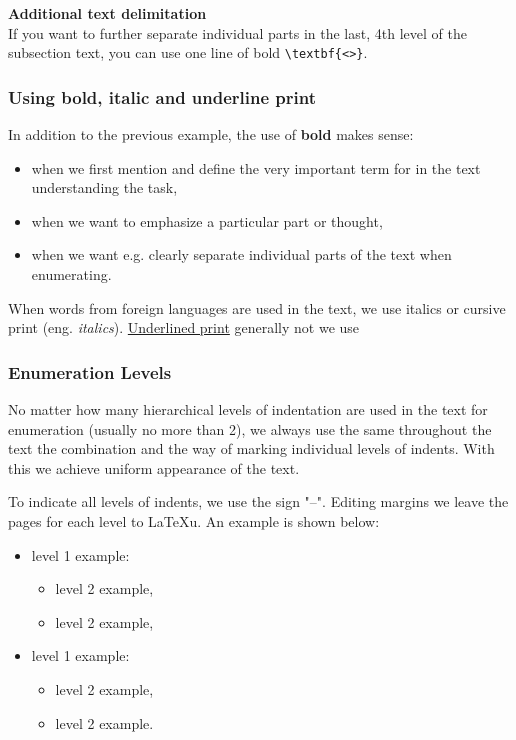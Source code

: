 \textbf{Additional text delimitation}\\
If you want to further separate individual parts in the last, 4th level of the subsection
text, you can use one line of bold \verb|\textbf{<>}|.

\subsubsection{Using bold, italic and underline
print}\label{sec:emphasis_types}

In addition to the previous example, the use of \textbf{bold} makes sense:
\begin{itemize}
\item when we first mention and define the very important term for in the text
understanding the task,
\item when we want to emphasize a particular part or thought,
\item when we want e.g. clearly separate individual parts of the text when enumerating.
\end{itemize}

When words from foreign languages are used in the text, we use italics or
cursive print (eng. \emph{italics}). \underline{Underlined print} generally not
we use


\subsubsection{Enumeration Levels}\label{sec:itemizing}

No matter how many hierarchical levels of indentation are used in the text for
enumeration (usually no more than 2), we always use the same throughout the text
the combination and the way of marking individual levels of indents. With this we achieve
uniform appearance of the text.

To indicate all levels of indents, we use the sign "--". Editing margins
we leave the pages for each level to \LaTeX u. An example is shown below:
\begin{itemize}
\item level 1 example:
\begin{itemize}
\item level 2 example,
\item level 2 example,
\end{itemize}
\item level 1 example:
\begin{itemize}
\item level 2 example,
\item level 2 example.
\end{itemize}
\end{itemize}

